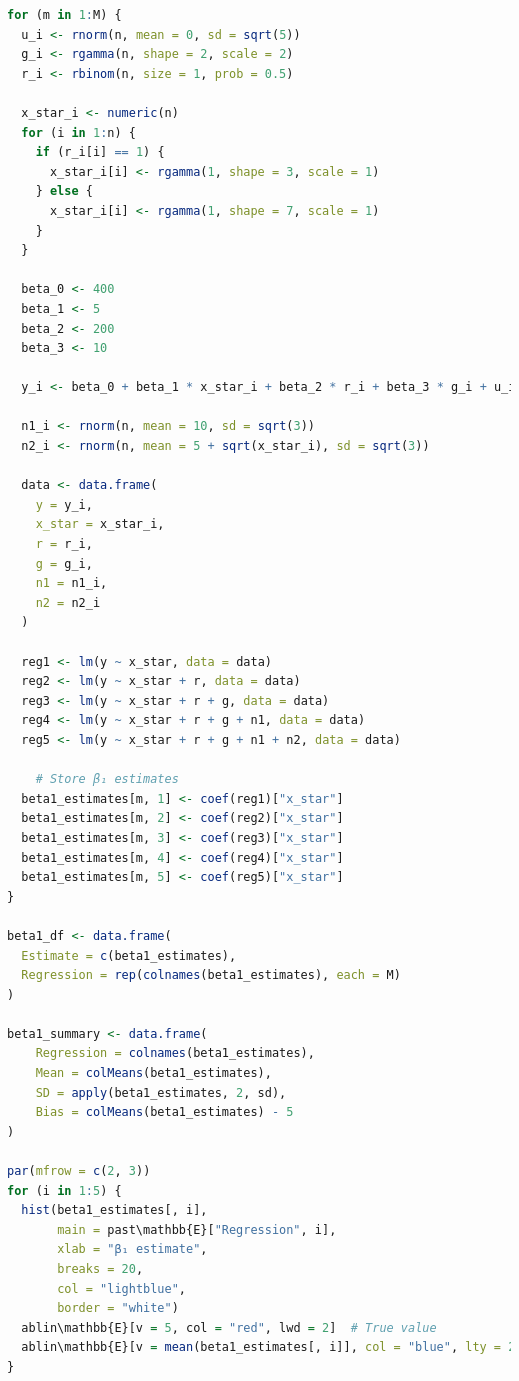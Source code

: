 \documentclass[a4paper,12pt]{article} %
\theoremstyle{nonitalic}
\newenvironment{solution}[1]
  {\renewcommand\theinnercustomsol{#1}\innercustomsol}
  {\endinnercustomsol}
\newcounter{solutionctr}
\renewcommand{\thesolutionctr}{(\alph{solutionctr})}
\newenvironment{autosolution}
  {\stepcounter{solutionctr}\begin{solution}{\thesolutionctr}}
  {\end{solution}}
\begin{document}
\begin{autosolution}
\begin{lstlisting}[language=R]
for (m in 1:M) {
  u_i <- rnorm(n, mean = 0, sd = sqrt(5))
  g_i <- rgamma(n, shape = 2, scale = 2)
  r_i <- rbinom(n, size = 1, prob = 0.5)
    
  x_star_i <- numeric(n)
  for (i in 1:n) {
    if (r_i[i] == 1) {
      x_star_i[i] <- rgamma(1, shape = 3, scale = 1)
    } else {
      x_star_i[i] <- rgamma(1, shape = 7, scale = 1)
    }
  }
    
  beta_0 <- 400
  beta_1 <- 5
  beta_2 <- 200
  beta_3 <- 10
    
  y_i <- beta_0 + beta_1 * x_star_i + beta_2 * r_i + beta_3 * g_i + u_i
    
  n1_i <- rnorm(n, mean = 10, sd = sqrt(3))
  n2_i <- rnorm(n, mean = 5 + sqrt(x_star_i), sd = sqrt(3))
    
  data <- data.frame(
    y = y_i,
    x_star = x_star_i,
    r = r_i,
    g = g_i,
    n1 = n1_i,
    n2 = n2_i
  )
  
  reg1 <- lm(y ~ x_star, data = data)
  reg2 <- lm(y ~ x_star + r, data = data)
  reg3 <- lm(y ~ x_star + r + g, data = data)
  reg4 <- lm(y ~ x_star + r + g + n1, data = data)
  reg5 <- lm(y ~ x_star + r + g + n1 + n2, data = data)
    
    # Store β₁ estimates
  beta1_estimates[m, 1] <- coef(reg1)["x_star"]
  beta1_estimates[m, 2] <- coef(reg2)["x_star"]
  beta1_estimates[m, 3] <- coef(reg3)["x_star"]
  beta1_estimates[m, 4] <- coef(reg4)["x_star"]
  beta1_estimates[m, 5] <- coef(reg5)["x_star"]
}

beta1_df <- data.frame(
  Estimate = c(beta1_estimates),
  Regression = rep(colnames(beta1_estimates), each = M)
)

beta1_summary <- data.frame(
    Regression = colnames(beta1_estimates),
    Mean = colMeans(beta1_estimates),
    SD = apply(beta1_estimates, 2, sd),
    Bias = colMeans(beta1_estimates) - 5
)

par(mfrow = c(2, 3))
for (i in 1:5) {
  hist(beta1_estimates[, i], 
       main = past\mathbb{E}["Regression", i], 
       xlab = "β₁ estimate",
       breaks = 20,
       col = "lightblue",
       border = "white")
  ablin\mathbb{E}[v = 5, col = "red", lwd = 2]  # True value
  ablin\mathbb{E}[v = mean(beta1_estimates[, i]], col = "blue", lty = 2, lwd = 2)  # Mean estimate
}
\end{lstlisting}

\end{autosolution}
\end{document}
